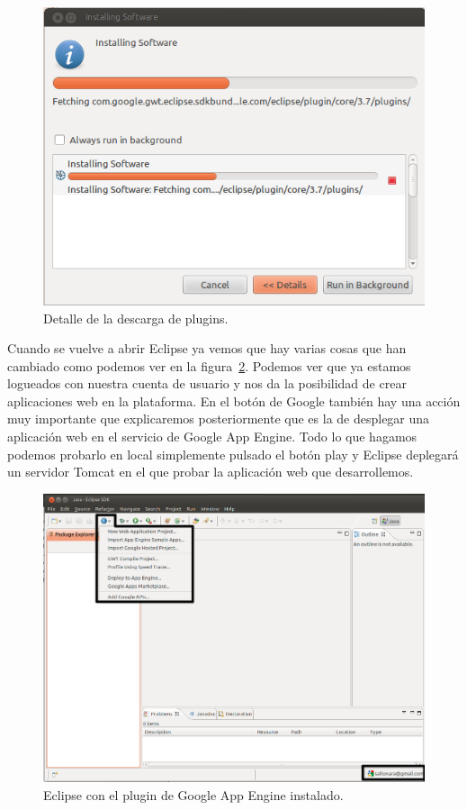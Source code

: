 \begin{figure}[hbt]
  \centering
    \includegraphics[scale=0.6]{./AnexoConfiguracionEclipse/imagenes/instalacionPlugins.png}
  \caption{Detalle de la descarga de plugins.}
  \label{fig:instalacionPlugins}
\end{figure}

Cuando se vuelve a abrir Eclipse ya vemos que hay varias cosas que han cambiado como podemos ver en la figura~\ref{fig:eclipseGAE}. Podemos ver que ya estamos logueados con nuestra cuenta de usuario y nos da la posibilidad de crear aplicaciones web en la plataforma. En el botón de Google también hay una acción muy importante que explicaremos posteriormente que es la de desplegar una aplicación web en el servicio de Google App Engine. Todo lo que hagamos podemos probarlo en local simplemente pulsado el botón play y Eclipse deplegará un servidor Tomcat en el que probar la aplicación web que desarrollemos.

\begin{figure}[hbt]
  \centering
    \includegraphics[scale=0.5]{./AnexoConfiguracionEclipse/imagenes/eclipseGAE.png}
  \caption{Eclipse con el plugin de Google App Engine instalado.}
  \label{fig:eclipseGAE}
\end{figure}

